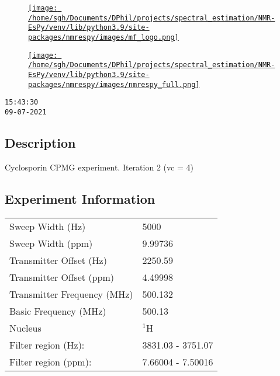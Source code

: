 \documentclass[8pt]{article}
\begin{document}
\begin{figure}[!ht]
\begin{minipage}[b][2.5cm][c]{.72\textwidth}
\href{http://foroozandeh.chem.ox.ac.uk/home}%
{\texttt{[image: /home/sgh/Documents/DPhil/projects/spectral\_estimation/NMR-EsPy/venv/lib/python3.9/site-packages/nmrespy/images/mf\_logo.png]}}
\end{minipage}
\begin{minipage}[b][2.5cm][c]{.27\textwidth}
\href{https://foroozandehgroup.github.io/NMR-EsPy}%
{\texttt{[image: /home/sgh/Documents/DPhil/projects/spectral\_estimation/NMR-EsPy/venv/lib/python3.9/site-packages/nmrespy/images/nmrespy\_full.png]}}
\end{minipage}
\end{figure}

\texttt{15:43:30\\09-07-2021}

\subsection*{Description}
Cyclosporin CPMG experiment.
Iteration 2 (vc = 4)

\subsection*{Experiment Information}
\hspace{-6pt}
\begin{tabular}{ll}
Sweep Width (Hz) & 5000 \\
Sweep Width (ppm) & 9.99736 \\
Transmitter Offset (Hz) & 2250.59 \\
Transmitter Offset (ppm) & 4.49998 \\
Transmitter Frequency (MHz) & 500.132 \\
Basic Frequency (MHz) & 500.13 \\
Nucleus & $^{1}$H \\
Filter region (Hz): & 3831.03 - 3751.07 \\
Filter region (ppm): & 7.66004 - 7.50016 \\

\end{tabular}
\end{document}
